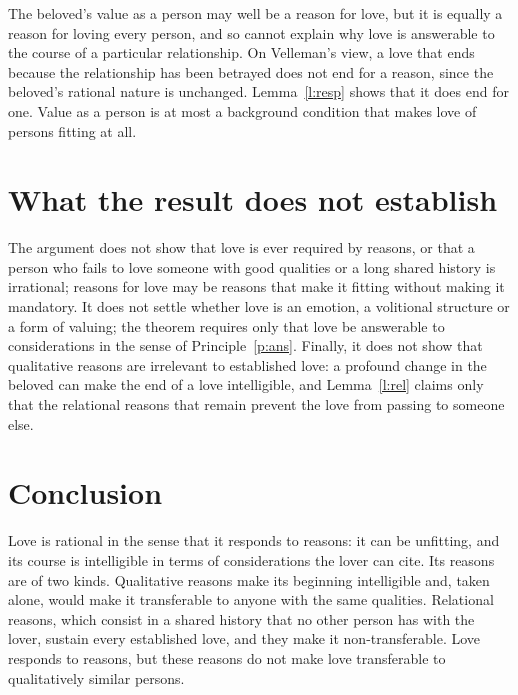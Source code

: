 \documentclass{situationist-preprint}
\begin{document}
\begin{reply}
The beloved's value as a person may well be a reason for love, but it is equally a reason for loving every person, and so cannot explain why love is answerable to the course of a particular relationship. On Velleman's view, a love that ends because the relationship has been betrayed does not end for a reason, since the beloved's rational nature is unchanged. Lemma~\ref{l:resp} shows that it does end for one. Value as a person is at most a background condition that makes love of persons fitting at all.
\end{reply}

\section{What the result does not establish}

The argument does not show that love is ever required by reasons, or that a person who fails to love someone with good qualities or a long shared history is irrational; reasons for love may be reasons that make it fitting without making it mandatory. It does not settle whether love is an emotion, a volitional structure or a form of valuing; the theorem requires only that love be answerable to considerations in the sense of Principle~\ref{p:ans}. Finally, it does not show that qualitative reasons are irrelevant to established love: a profound change in the beloved can make the end of a love intelligible, and Lemma~\ref{l:rel} claims only that the relational reasons that remain prevent the love from passing to someone else.

\section{Conclusion}

Love is rational in the sense that it responds to reasons: it can be unfitting, and its course is intelligible in terms of considerations the lover can cite. Its reasons are of two kinds. Qualitative reasons make its beginning intelligible and, taken alone, would make it transferable to anyone with the same qualities. Relational reasons, which consist in a shared history that no other person has with the lover, sustain every established love, and they make it non-transferable. Love responds to reasons, but these reasons do not make love transferable to qualitatively similar persons.
\end{document}
